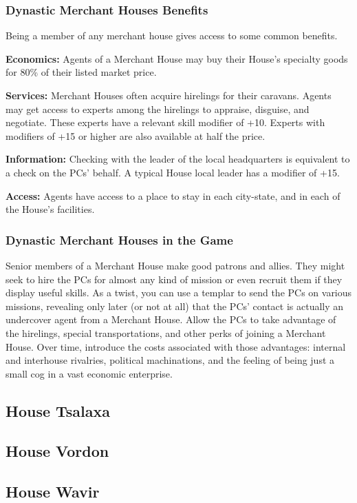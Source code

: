 \subsubsection{Dynastic Merchant Houses Benefits}
Being a member of any merchant house gives access to some common benefits.

\textbf{Economics:} Agents of a Merchant House may buy their House's specialty goods for 80\% of their listed market price.

\textbf{Services:} Merchant Houses often acquire hirelings for their caravans. Agents may get access to experts among the hirelings to appraise, disguise, and negotiate. These experts have a relevant skill modifier of +10. Experts with modifiers of +15 or higher are also available at half the price.

\textbf{Information:} Checking with the leader of the local headquarters is equivalent to a  check on the PCs' behalf. A typical House local leader has a  modifier of +15.

\textbf{Access:} Agents have access to a place to stay in each city-state, and in each of the House's facilities.

\subsubsection{Dynastic Merchant Houses in the Game}
Senior members of a Merchant House make good patrons and allies. They might seek to hire the PCs for almost any kind of mission or even recruit them if they display useful skills. As a twist, you can use a templar to send the PCs on various missions, revealing only later (or not at all) that the PCs' contact is actually an undercover agent from a Merchant House. Allow the PCs to take advantage of the hirelings, special transportations, and other perks of joining a Merchant House. Over time, introduce the costs associated with those advantages: internal and interhouse rivalries, political machinations, and the feeling of being just a small cog in a vast economic enterprise.






\subsection{House Tsalaxa}
\subsection{House Vordon}
\subsection{House Wavir}